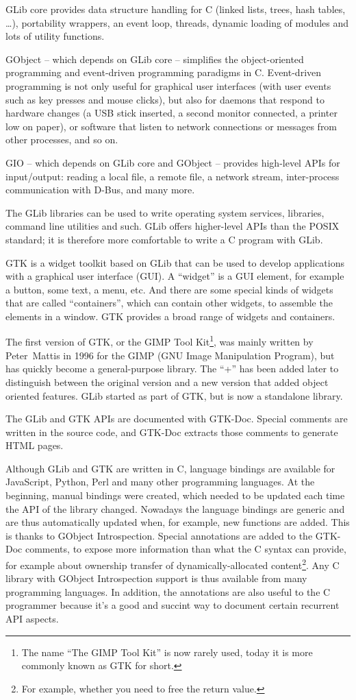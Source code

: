 GLib core provides data structure handling for C (linked lists, trees, hash tables, …), portability wrappers, an event loop, threads, dynamic loading of modules and lots of utility functions.

GObject -- which depends on GLib core -- simplifies the object-oriented programming and event-driven programming paradigms in C. Event-driven programming is not only useful for graphical user interfaces (with user events such as key presses and mouse clicks), but also for daemons that respond to hardware changes (a USB stick inserted, a second monitor connected, a printer low on paper), or software that listen to network connections or messages from other processes, and so on.

GIO -- which depends on GLib core and GObject -- provides high-level APIs for input/output: reading a local file, a remote file, a network stream, inter-process communication with D-Bus, and many more.

The GLib libraries can be used to write operating system services, libraries, command line utilities and such. GLib offers higher-level APIs than the POSIX standard; it is therefore more comfortable to write a C program with GLib.

GTK is a widget toolkit based on GLib that can be used to develop applications with a graphical user interface (GUI). A ``widget'' is a GUI element, for example a button, some text, a menu, etc. And there are some special kinds of widgets that are called ``containers'', which can contain other widgets, to assemble the elements in a window. GTK provides a broad range of widgets and containers.

The first version of GTK, or the GIMP Tool Kit\footnote{The name ``The GIMP Tool Kit'' is now rarely used, today it is more commonly known as GTK for short.}, was mainly written by Peter~Mattis in 1996 for the GIMP (GNU Image Manipulation Program), but has quickly become a general-purpose library. The ``+'' has been added later to distinguish between the original version and a new version that added object oriented features. GLib started as part of GTK, but is now a standalone library.

The GLib and GTK APIs are documented with GTK-Doc. Special comments are written in the source code, and GTK-Doc extracts those comments to generate HTML pages.

Although GLib and GTK are written in C, language bindings are available for JavaScript, Python, Perl and many other programming languages. At the beginning, manual bindings were created, which needed to be updated each time the API of the library changed. Nowadays the language bindings are generic and are thus automatically updated when, for example, new functions are added. This is thanks to GObject Introspection. Special annotations are added to the GTK-Doc comments, to expose more information than what the C syntax can provide, for example about ownership transfer of dynamically-allocated content\footnote{For example, whether you need to free the return value.}. Any C library with GObject Introspection support is thus available from many programming languages. In addition, the annotations are also useful to the C programmer because it's a good and succint way to document certain recurrent API aspects.

